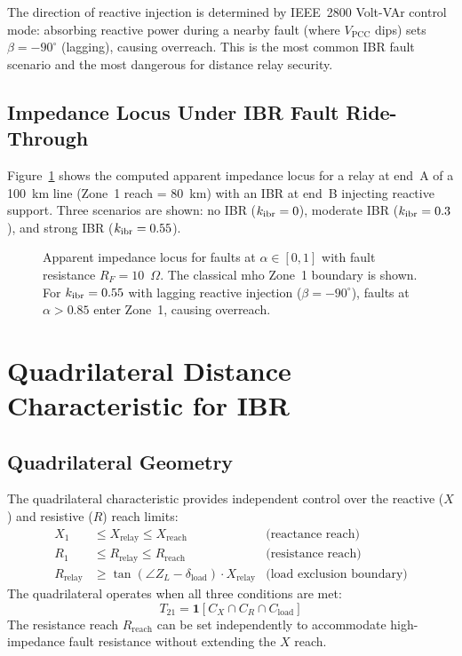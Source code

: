 The direction of reactive injection is determined by IEEE~2800 Volt-VAr
control mode: absorbing reactive power during a nearby fault (where
$V_\mathrm{PCC}$ dips) sets $\beta = -90^\circ{}$ (lagging), causing overreach.
This is the most common IBR fault scenario and the most dangerous for
distance relay security.

\subsection{Impedance Locus Under IBR Fault Ride-Through}

Figure~\ref{fig:ch5_impedance_locus} shows the computed apparent impedance
locus for a relay at end~A of a 100~km line (Zone~1 reach = 80~km) with
an IBR at end~B injecting reactive support. Three scenarios are shown:
no IBR ($k_\mathrm{ibr} = 0$), moderate IBR ($k_\mathrm{ibr} = 0.3$), and strong IBR
($k_\mathrm{ibr} = 0.55$).

\begin{figure}[htbp]
  \centering
  
  \caption{Apparent impedance locus for faults at $\alpha \in [0, 1]$
           with fault resistance $R_F = 10$~$\Omega$. The classical mho
           Zone~1 boundary is shown. For $k_\mathrm{ibr} = 0.55$ with lagging
           reactive injection ($\beta = -90^\circ{}$), faults at $\alpha > 0.85$
           enter Zone~1, causing overreach.}
  \label{fig:ch5_impedance_locus}
\end{figure}

\section{Quadrilateral Distance Characteristic for IBR}
\label{sec:ch5_quadrilateral}

\subsection{Quadrilateral Geometry}

The quadrilateral characteristic provides independent control over
the reactive ($X$) and resistive ($R$) reach limits:
\begin{align}
  X_1 &\leq X_\mathrm{relay} \leq X_\mathrm{reach} & \text{(reactance reach)}
  \label{eq:ch5_quad_x} \\
  R_1 &\leq R_\mathrm{relay} \leq R_\mathrm{reach} & \text{(resistance reach)}
  \label{eq:ch5_quad_r} \\
  R_\mathrm{relay} &\geq \tan(\angle Z_L - \delta_\mathrm{load}) \cdot X_\mathrm{relay}
    & \text{(load exclusion boundary)}
  \label{eq:ch5_quad_load}
\end{align}
The quadrilateral operates when all three conditions are met:
\begin{equation}
  T_{21} = \mathbf{1}[C_X \cap C_R \cap C_\mathrm{load}]
  \label{eq:ch5_quad_trip}
\end{equation}
The resistance reach $R_\mathrm{reach}$ can be set independently to
accommodate high-impedance fault resistance without extending the $X$ reach.

